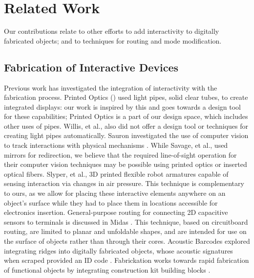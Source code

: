 \section{Related Work}

Our contributions relate to other efforts to add interactivity to digitally fabricated objects; and to techniques for routing and mode modification.  



\subsection{Fabrication of Interactive Devices}

Previous work has investigated the integration of interactivity with the fabrication process.  Printed Optics (\cite{Willis-printedoptics}) used light pipes, solid clear tubes, to create integrated displays: our work is inspired by this and goes towards a design tool for these capabilities; Printed Optics is a part of our design space, which includes other uses of pipes.  Willis, et al., also did not offer a design tool or techniques for creating light pipes automatically.  Sauron investigated the use of computer vision to track interactions with physical mechanisms \cite{Savage-sauron}.  While Savage, et al., used mirrors for redirection, we believe that the required line-of-sight operation for their computer vision techniques may be possible using printed optics or inserted optical fibers.  Slyper, et al., \cite{Slyper-pressure} 3D printed flexible robot armatures capable of sensing interaction via changes in air pressure.  This technique is complementary to ours, as we allow for placing these interactive elements anywhere on an object's surface while they had to place them in locations accessible for electronics insertion.  General-purpose routing for connecting 2D capacitive sensors to terminals is discussed in Midas \cite{Savage-midas}.  This technique, based on circuitboard routing, are limited to planar and unfoldable shapes, and are intended for use on the surface of objects rather than through their cores.  Acoustic Barcodes explored integrating ridges into digitally fabricated objects, whose acoustic signatures when scraped provided an ID code \cite{Harrison-acoustic}.  Fabrickation works towards rapid fabrication of functional objects by integrating construction kit building blocks \cite{Mueller-fabrickation}.

